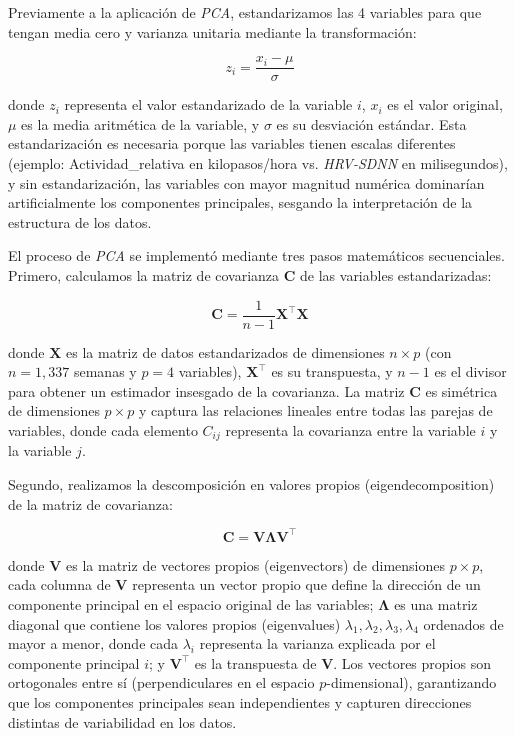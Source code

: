 Previamente a la aplicación de \textit{PCA}, estandarizamos las 4 variables para que tengan media cero y varianza unitaria mediante la transformación:

\begin{equation}
z_i = \frac{x_i - \mu}{\sigma}
\label{eq:estandarizacion}
\end{equation}

donde $z_i$ representa el valor estandarizado de la variable $i$, $x_i$ es el valor original, $\mu$ es la media aritmética de la variable, y $\sigma$ es su desviación estándar. Esta estandarización es necesaria porque las variables tienen escalas diferentes (ejemplo: Actividad\_relativa en kilopasos/hora vs. \textit{HRV-SDNN} en milisegundos), y sin estandarización, las variables con mayor magnitud numérica dominarían artificialmente los componentes principales, sesgando la interpretación de la estructura de los datos.

El proceso de \textit{PCA} se implementó mediante tres pasos matemáticos secuenciales. Primero, calculamos la matriz de covarianza $\mathbf{C}$ de las variables estandarizadas:

\begin{equation}
\mathbf{C} = \frac{1}{n-1}\mathbf{X}^\top\mathbf{X}
\label{eq:matriz_covarianza}
\end{equation}

donde $\mathbf{X}$ es la matriz de datos estandarizados de dimensiones $n \times p$ (con $n=1,337$ semanas y $p=4$ variables), $\mathbf{X}^\top$ es su transpuesta, y $n-1$ es el divisor para obtener un estimador insesgado de la covarianza. La matriz $\mathbf{C}$ es simétrica de dimensiones $p \times p$ y captura las relaciones lineales entre todas las parejas de variables, donde cada elemento $C_{ij}$ representa la covarianza entre la variable $i$ y la variable $j$.

Segundo, realizamos la descomposición en valores propios (eigendecomposition) de la matriz de covarianza:

\begin{equation}
\mathbf{C} = \mathbf{V}\mathbf{\Lambda}\mathbf{V}^\top
\label{eq:eigendecomposition}
\end{equation}

donde $\mathbf{V}$ es la matriz de vectores propios (eigenvectors) de dimensiones $p \times p$, cada columna de $\mathbf{V}$ representa un vector propio que define la dirección de un componente principal en el espacio original de las variables; $\mathbf{\Lambda}$ es una matriz diagonal que contiene los valores propios (eigenvalues) $\lambda_1, \lambda_2, \lambda_3, \lambda_4$ ordenados de mayor a menor, donde cada $\lambda_i$ representa la varianza explicada por el componente principal $i$; y $\mathbf{V}^\top$ es la transpuesta de $\mathbf{V}$. Los vectores propios son ortogonales entre sí (perpendiculares en el espacio $p$-dimensional), garantizando que los componentes principales sean independientes y capturen direcciones distintas de variabilidad en los datos.

